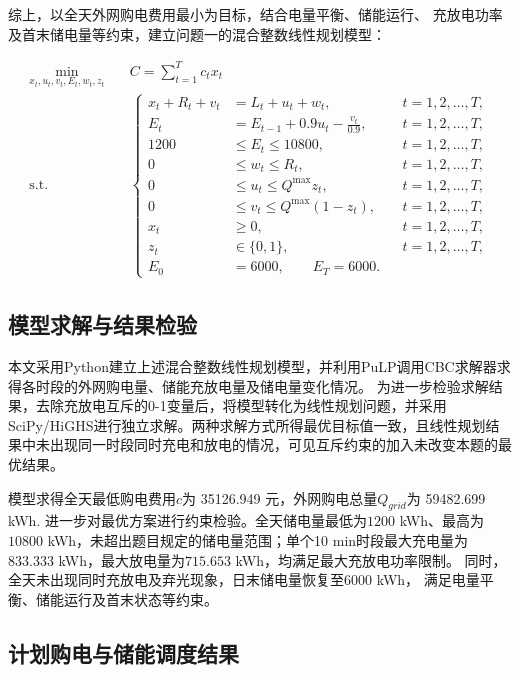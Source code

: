 综上，以全天外网购电费用最小为目标，结合电量平衡、储能运行、
充放电功率及首末储电量等约束，建立问题一的混合整数线性规划模型：




\begin{equation}
\begin{aligned}
\min_{x_t,u_t,v_t,E_t,w_t,z_t}\quad
& C=\sum_{t=1}^{T}c_t x_t \\[2mm]
\mathrm{s.t.}\quad
& \left\{
\begin{aligned}
x_t+R_t+v_t
    &=L_t+u_t+w_t,
&& t=1,2,\ldots,T,\\
E_t
    &=E_{t-1}+0.9u_t-\frac{v_t}{0.9},
&& t=1,2,\ldots,T,\\
1200
    &\leq E_t\leq10800,
&& t=1,2,\ldots,T,\\
0
    &\leq w_t\leq R_t,
&& t=1,2,\ldots,T,\\
0
    &\leq u_t\leq Q^{\max}z_t,
&& t=1,2,\ldots,T,\\
0
    &\leq v_t\leq Q^{\max}(1-z_t),
&& t=1,2,\ldots,T,\\
x_t
    &\geq0,
&& t=1,2,\ldots,T,\\
z_t
    &\in\{0,1\},
&& t=1,2,\ldots,T,\\
E_0&=6000,\qquad E_T=6000.
\end{aligned}
\right.
\end{aligned}
\label{eq:p1_model}
\end{equation}


\subsection{模型求解与结果检验}

本文采用Python建立上述混合整数线性规划模型，并利用PuLP调用CBC求解器求得各时段的外网购电量、储能充放电量及储电量变化情况。
为进一步检验求解结果，去除充放电互斥的0-1变量后，将模型转化为线性规划问题，并采用SciPy/HiGHS进行独立求解。两种求解方式所得最优目标值一致，且线性规划结果中未出现同一时段同时充电和放电的情况，可见互斥约束的加入未改变本题的最优结果。

模型求得全天最低购电费用$c$为 35126.949 元，外网购电总量$Q_{grid}$为 59482.699 kWh.
进一步对最优方案进行约束检验。全天储电量最低为$1200$ kWh、最高为
$10800$ kWh，未超出题目规定的储电量范围；单个10 min时段最大充电量为
$833.333$ kWh，最大放电量为$715.653$ kWh，均满足最大充放电功率限制。
同时，全天未出现同时充放电及弃光现象，日末储电量恢复至$6000$ kWh，
满足电量平衡、储能运行及首末状态等约束。


\subsection{计划购电与储能调度结果}

